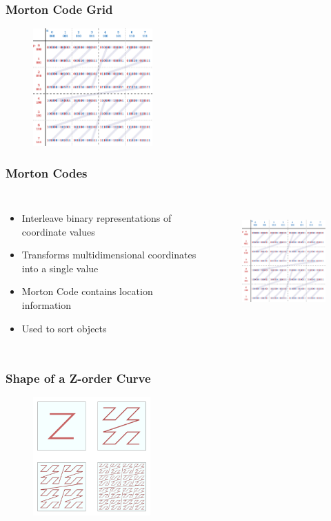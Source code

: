 \documentclass{beamer}
\begin{document}
\begin{frame}
  \frametitle{Morton Code Grid}
\begin{figure}
\includegraphics[height=45mm]{Z-curve.png}
\end{figure}
\end{frame}

\begin{frame}
  \frametitle{Morton Codes}
\begin{columns}[t]

\centering
\begin{itemize}
\item Interleave binary representations of coordinate values
\item Transforms multidimensional coordinates into a single value
\item Morton Code contains location information
\item Used to sort objects
\end{itemize}

\begin{figure}
\includegraphics[height=45mm]{Z-curve.pdf}
\end{figure}
\end{columns}
\end{frame}

\begin{frame}
  \frametitle{Shape of a Z-order Curve}
\begin{figure}
\includegraphics[height=45mm]{542px-Four-level_Z.png}
\end{figure}
\end{frame}
\end{document}
